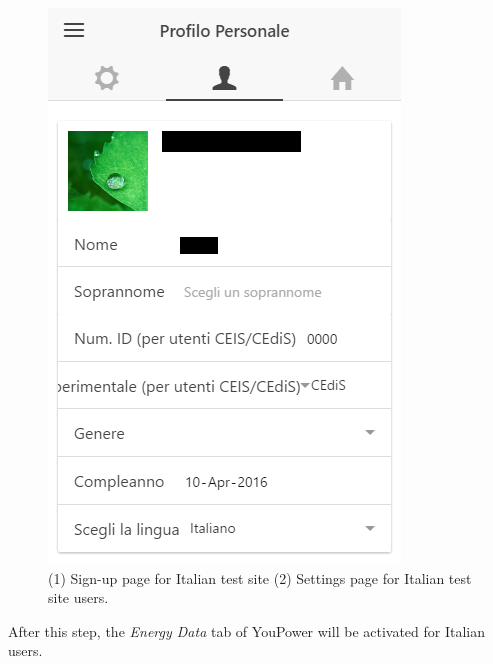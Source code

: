 \begin{enumerate}
\begin{figure}
\begin{center}
\begin{minipage}[htb]{0.45\linewidth}
         \includegraphics[width=1\linewidth]{img/Italiansettings.png}  
        \end{minipage}
      \end{center}
    \caption{(1) Sign-up page for Italian test site (2) Settings page for Italian test site users.
}
\label{fig:reg_italian}
\end{figure}

After this step, the \textit{Energy Data} tab of YouPower will be activated for Italian users.
\end{enumerate}